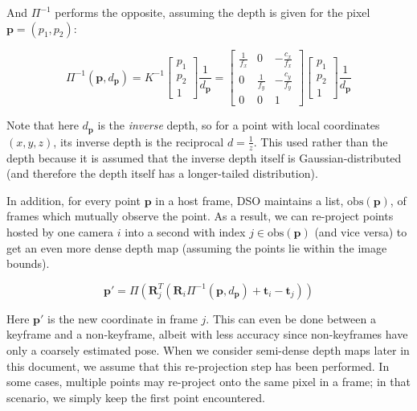 And $\Pi^{-1}$ performs the opposite, assuming the depth is given for the pixel $\boldsymbol{p} = (p_1, p_2)$:

\begin{equation}
\Pi^{-1}(\boldsymbol{p}, d_{\boldsymbol{p}}) = 
K^{-1}
\begin{bmatrix}
p_1 \\
p_2 \\
1
\end{bmatrix}
\frac{1}{d_{\boldsymbol{p}}}
=
\begin{bmatrix}
\frac{1}{f_x} & 0 & -\frac{c_x}{f_x} \\
0 & \frac{1}{f_y} & -\frac{c_y}{f_y} \\
0 & 0 & 1
\end{bmatrix} 
\begin{bmatrix}
p_1 \\
p_2 \\
1
\end{bmatrix}
\frac{1}{d_{\boldsymbol{p}}}
\end{equation}

Note that here $d_{\boldsymbol{p}}$ is the \textit{inverse} depth, so for a point with local coordinates $(x, y, z)$, its inverse depth is the reciprocal $d = \frac{1}{z}$. This used rather than the depth because it is assumed that the inverse depth itself is Gaussian-distributed (and therefore the depth itself has a longer-tailed distribution).

In addition, for every point $\boldsymbol{p}$ in a host frame, DSO maintains a list, $\text{obs}(\boldsymbol{p})$, of frames which mutually observe the point. As a result, we can re-project points hosted by one camera $i$ into a second with index $j\in \text{obs}(\boldsymbol{p})$ (and vice versa) to get an even more dense depth map (assuming the points lie within the image bounds).

\begin{equation}
\boldsymbol{p}' = \Pi(\boldsymbol{R}_j^T (\boldsymbol{R}_i \Pi^{-1}(\boldsymbol{p}, d_{\boldsymbol{p}}) + \boldsymbol{t}_i - \boldsymbol{t}_j))
\end{equation}

Here $\boldsymbol{p}'$ is the new coordinate in frame $j$. This can even be done between a keyframe and a non-keyframe, albeit with less accuracy since non-keyframes have only a coarsely estimated pose. When we consider semi-dense depth maps later in this document, we assume that this re-projection step has been performed. In some cases, multiple points may re-project onto the same pixel in a frame; in that scenario, we simply keep the first point encountered.

